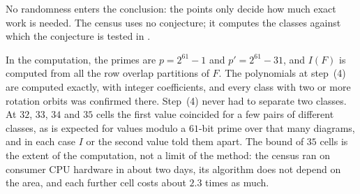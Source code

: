 \documentclass[11pt,a4paper]{amsart}
\numberwithin{equation}{section}
\theoremstyle{plain}
\theoremstyle{definition}
\begin{document}
No randomness enters the conclusion: the points only decide how much exact work is needed.  The census uses no conjecture; it computes the classes against which the conjecture is tested in .

In the computation, the primes are \(p=2^{61}-1\) and \(p'=2^{61}-31\), and \(I(F)\) is computed from all the row overlap partitions of \(F\).  The polynomials at step~(4) are computed exactly, with integer coefficients, and every class with two or more rotation orbits was confirmed there.  Step~(4) never had to separate two classes.  At \(32\), \(33\), \(34\) and \(35\) cells the first value coincided for a few pairs of different classes, as is expected for values modulo a \(61\)-bit prime over that many diagrams, and in each case \(I\) or the second value told them apart.  The bound of \(35\) cells is the extent of the computation, not a limit of the method: the census ran on consumer CPU hardware in about two days, its algorithm does not depend on the area, and each further cell costs about \(2.3\) times as much.
\end{document}
